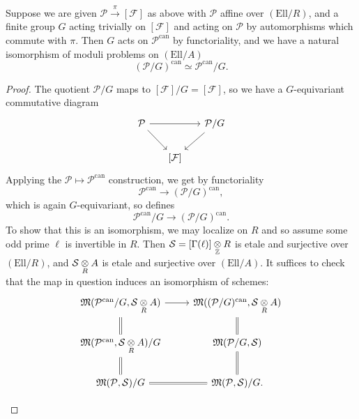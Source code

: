 \begin{kcor}\label{cor:9.1.10}
Suppose we are given $\mathcal{P} \xrightarrow{\ \pi\ } [\mathcal{F}]$ as above with $\mathcal{P}$ affine over $(\mathrm{Ell}/R)$, and a finite group $G$ acting trivially on $[\mathcal{F}]$ and acting on $\mathcal{P}$ by automorphisms which commute with $\pi$. Then $G$ acts on $\mathcal{P}^{\mathrm{can}}$ by functoriality, and we have a natural isomorphism of moduli problems on $(\mathrm{Ell}/A)$
\[
(\mathcal{P}/G)^{\mathrm{can}} \simeq \mathcal{P}^{\mathrm{can}}/G .
\]
\end{kcor}

\begin{proof}
The quotient $\mathcal{P}/G$ maps to $[\mathcal{F}]/G = [\mathcal{F}]$, so we have a $G$-equivariant commutative diagram
\begin{equation*}
\begin{tikzcd}[row sep=1.8em, column sep=1.5em]
\mathcal{P} \arrow[rr] \arrow[rd] & & \mathcal{P}/G \arrow[ld] \\
& {[\mathcal{F}]} &
\end{tikzcd}
\end{equation*}
Applying the $\mathcal{P} \mapsto \mathcal{P}^{\mathrm{can}}$ construction, we get by functoriality
\[
\mathcal{P}^{\mathrm{can}} \to (\mathcal{P}/G)^{\mathrm{can}} ,
\]
which is again $G$-equivariant, so defines
\[
\mathcal{P}^{\mathrm{can}}/G \to (\mathcal{P}/G)^{\mathrm{can}} .
\]
To show that this is an isomorphism, we may localize on $R$ and so assume some odd prime $\ell$ is invertible in $R$. Then $\mathcal{S} = [\Gamma(\ell)] \underset{\mathbb{Z}}{\otimes} R$ is etale and surjective over $(\mathrm{Ell}/R)$, and $\mathcal{S} \underset{R}{\otimes} A$ is etale and surjective over $(\mathrm{Ell}/A)$. It suffices to check that the map in question induces an isomorphism of schemes:
\[
\begin{tikzcd}[row sep=1.8em, column sep=2.5em, baseline=(current bounding box.south)]
\Mfrak(\mathcal{P}^{\mathrm{can}}/G, \mathcal{S} \tens{R} A) \arrow[r] \arrow[d, equal] & \Mfrak((\mathcal{P}/G)^{\mathrm{can}}, \mathcal{S} \tens{R} A) \arrow[d, equal] \\
\Mfrak(\mathcal{P}^{\mathrm{can}}, \mathcal{S} \tens{R} A)/G \arrow[d, equal] & \Mfrak(\mathcal{P}/G, \mathcal{S}) \arrow[d, equal] \\
\Mfrak(\mathcal{P}, \mathcal{S})/G \arrow[r, equal] & \Mfrak(\mathcal{P}, \mathcal{S})/G .
\end{tikzcd} \qedhere
\]
\end{proof}

